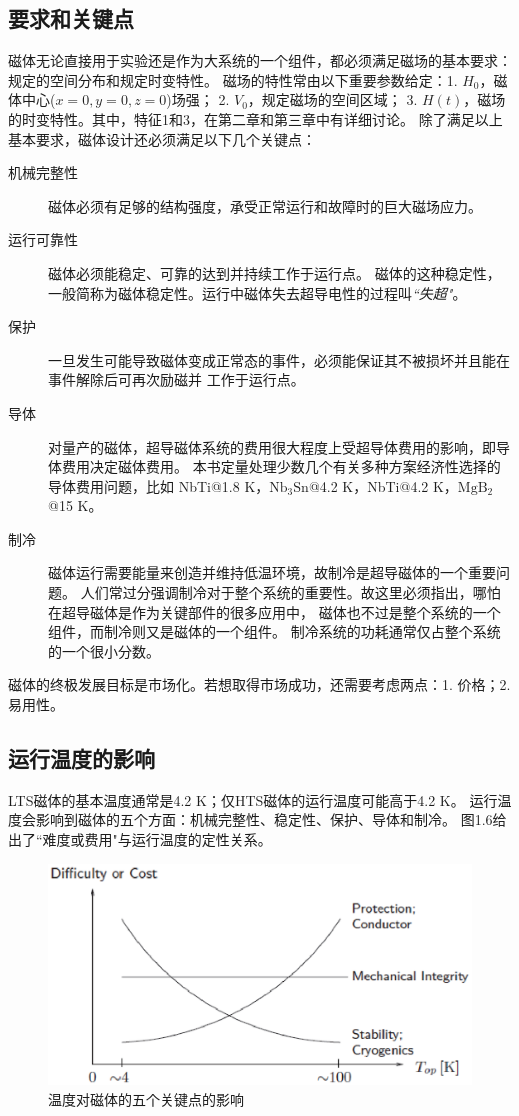 \subsection{要求和关键点}
磁体无论直接用于实验还是作为大系统的一个组件，都必须满足磁场的基本要求：规定的空间分布和规定时变特性。
磁场的特性常由以下重要参数给定：1. $H_0$，磁体中心($x=0, y=0, z=0$)场强；
2. $V_0$，规定磁场的空间区域；
3. $H(t)$，磁场的时变特性。其中，特征1和3，在第二章和第三章中有详细讨论。
除了满足以上基本要求，磁体设计还必须满足以下几个关键点：
\begin{description}
  \item[机械完整性] 磁体必须有足够的结构强度，承受正常运行和故障时的巨大磁场应力。
  \item[运行可靠性] 磁体必须能稳定、可靠的达到并持续工作于运行点。
  磁体的这种稳定性，一般简称为磁体稳定性。运行中磁体失去超导电性的过程叫\textit{``失超"}。
  \item[保护] 一旦发生可能导致磁体变成正常态的事件，必须能保证其不被损坏并且能在事件解除后可再次励磁并
  工作于运行点。
  \item[导体] 对量产的磁体，超导磁体系统的费用很大程度上受超导体费用的影响，即导体费用决定磁体费用。
  本书定量处理少数几个有关多种方案经济性选择的导体费用问题，比如
NbTi@1.8 K，$\mathrm{Nb_3Sn}$@4.2 K，NbTi@4.2 K，$\mathrm{MgB_2}$@15 K。
  \item[制冷] 磁体运行需要能量来创造并维持低温环境，故制冷是超导磁体的一个重要问题。
  人们常过分强调制冷对于整个系统的重要性。故这里必须指出，哪怕在超导磁体是作为关键部件的很多应用中，
  磁体也不过是整个系统的一个组件，而制冷则又是磁体的一个组件。
  制冷系统的功耗通常仅占整个系统的一个很小分数。
\end{description}

磁体的终极发展目标是市场化。若想取得市场成功，还需要考虑两点：1. 价格；2. 易用性。

\subsection{运行温度的影响}
LTS磁体的基本温度通常是4.2 K；仅HTS磁体的运行温度可能高于4.2 K。
运行温度会影响到磁体的五个方面：机械完整性、稳定性、保护、导体和制冷。
图1.6给出了``难度或费用"与运行温度的定性关系。
\begin{figure}
  \centering
 \includegraphics[scale=0.6]{chpt1/figs/fig1.6.eps}
  \caption{
温度对磁体的五个关键点的影响
}
\end{figure}

